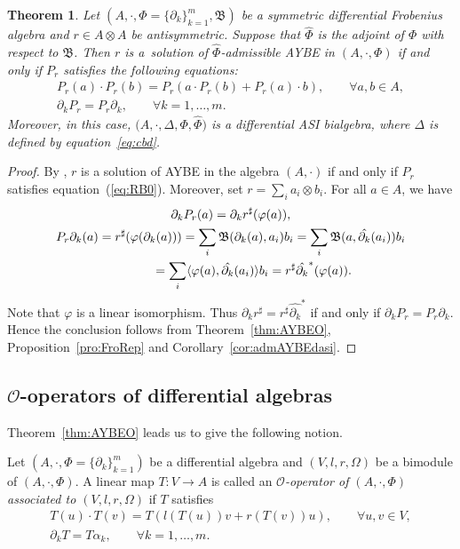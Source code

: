 \documentclass[pdftex]{sigma}
\numberwithin{equation}{section}
\newtheorem{Theorem}{Theorem}[section]
\begin{document}
\begin{Theorem}
 Let $(A, \cdot, \Phi = \{\partial_k\}_{k=1}^m, \mathfrak{B})$ be a symmetric differential Frobenius algebra and $r \in A \otimes A$ be antisymmetric.
 Suppose that $\hat{\Phi}$ is the adjoint of $\Phi$ with respect to $\mathfrak{B}$.
	Then $r$ is a~solution of $\hat{\Phi}$-admissible AYBE in $(A, \cdot, \Phi)$ if and only if
 $P_r$ satisfies the following equations:
 \begin{gather}
 P_r(a) \cdot P_r(b) = P_r(a \cdot P_r(b) + P_r(a) \cdot b), \qquad \forall a, b \in
 A,\label{eq:RB0}\\
		\partial_k P_r = P_r \partial_k,\qquad \forall k=1, \dots, m.
 \end{gather}
Moreover, in this case, $\big(A, \cdot, \Delta, \Phi, \hat{\Phi}\big)$ is
a differential ASI bialgebra, where $\Delta$ is defined by
equation~\eqref{eq:cbd}.
\end{Theorem}
\begin{proof}
 By \cite[Corollary~3.17]{Bai2013O},
 $r$ is a solution of AYBE in the algebra $(A, \cdot)$ if and only if $P_r$ satisfies equation~(\ref{eq:RB0}).
 Moreover, set $r = \sum_i a_i\otimes b_i$.
 For all $a \in A$, we have
 \begin{gather*}
 \partial_k P_r(a) = \partial_k r^\sharp (\varphi(a)), \\
 P_r \partial_k(a) = r^\sharp(\varphi(\partial_k(a))) = \sum_i \mathfrak{B}(\partial_k(a),a_i) b_i = \sum_i \mathfrak{B}(a, \hat{\partial_k}(a_i)) b_i \\
 \hphantom{P_r \partial_k(a)}{}
 = \sum_i \langle \varphi(a), \hat{\partial_k}(a_i) \rangle b_i = r^\sharp \hat{\partial_k}^*(\varphi(a)).
 \end{gather*}
 Note that $\varphi$ is a linear isomorphism. Thus $\partial_k r^\sharp = r^\sharp \hat{\partial_k}^*$ if and only if $\partial_k P_r = P_r \partial_k$.
 Hence the conclusion follows from Theorem~\ref{thm:AYBEO}, Proposition~\ref{pro:FroRep} and Corollary~\ref{cor:admAYBEdasi}.
\end{proof}

\subsection[O-operators of differential algebras]{$\boldsymbol{\mathcal{O}}$-operators of differential algebras}\label{subsec:o_operator}

Theorem~\ref{thm:AYBEO} leads us to give the following notion.
\begin{Definition}
	Let $(A, \cdot, \Phi = \{\partial_k\}_{k=1}^m)$ be a differential algebra and $(V, l, r, \Omega)$ be a bimodule of $(A, \cdot, \Phi)$.
	A linear map $T\colon V \to A$ is called an \textit{$\mathcal{O}$-operator of $(A, \cdot, \Phi)$ associated to $(V, l, r, \Omega)$} if $T$ satisfies
	\begin{gather}
		T(u) \cdot T(v) = T( l(T(u))v + r(T(v)) u ), \qquad \forall u, v \in V, \label{eq:oop1} \\
		\partial_k T = T \alpha_k, \qquad \forall k=1, \dots, m. \label{eq:oop2}
	\end{gather}
\end{Definition}
\end{document}
